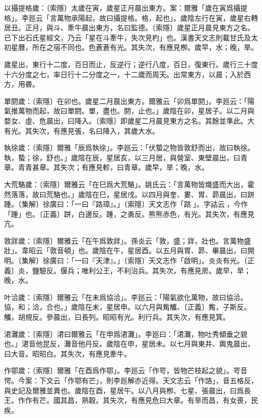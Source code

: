 以攝提格歲：〔索隱〕太歲在寅，歲星正月晨出東方。案：爾雅「歲在寅爲攝提格」。李廵云「言萬物承陽起，故曰攝提格。格，起也」。歲陰左行在寅，歲星右轉居丑。正月，與斗、牽牛晨出東方，名曰監德。〔索隱〕歲星正月晨見東方之名。已下出石氏星經文，乃云「星在斗牽牛，失次見杓」也。漢書天文志則載甘氏及太初星曆，所在之宿不同也。色蒼蒼有光。其失次，有應見栁。歲早，水；晚，旱。

歲星出，東行十二度，百日而止，反逆行；逆行八度，百日，復東行。歲行三十度十六分度之七，率日行十二分度之一，十二歲而周天。出常東方，以晨；入於西方，用昬。

單閼歲：〔索隱〕在卯也。歲星二月晨出東方。爾雅云「卯爲單閼」。李廵云：「陽氣推萬物而起，故曰單閼。單，盡也。閼，止也。」歲陰在卯，星居子。以二月與婺女、虛、危晨出，曰降入。〔索隱〕即歲星二月晨見東方之名。其餘並準此。大有光。其失次，有應見張，名曰降入，其歲大水。

執徐歲：〔索隱〕爾雅「辰爲執徐」。李廵云：「伏蟄之物皆敦舒而出，故曰執徐。執，蟄；徐，舒也。」歲陰在辰，星居亥，以三月居，與營室、東壁晨出，曰青章。青青甚章。其失次；有應見軫，曰青章。歲早，旱；晚，水。

大荒駱歲：〔索隱〕爾雅云「在巳爲大荒駱」。姚氏云：「言萬物皆熾盛而大出，霍然落落，故曰荒駱也。」歲陰在巳，星居戌。以四月與奎、婁、胃、昴晨出，曰跰踵。〔集解〕徐廣曰：「一曰『路璋』。」〔索隱〕天文志作「路𡺽」。字詁云𡺽，今作「踵」也。〔正義〕跰，白邊反。踵，之勇反。熊熊赤色，有光。其失次，有應見亢。

敦牂歲：〔索隱〕爾雅云「在午爲敦牂」。孫炎云「敦，盛；牂，壯也。言萬物盛壯」。韋昭云「敦音頓」也。歲陰在午，星居酉。以五月與胃、昴、畢晨出，曰開明。〔集解〕徐廣曰：「一曰『天津』。」〔索隱〕天文志作「啟明」。炎炎有光。〔正義〕炎，鹽驗反。偃兵；唯利公王，不利治兵。其失次，有應見房。歲早，旱；晚，水。

叶洽歲：〔索隱〕爾雅云「在未爲協洽」。李廵云：「陽氣欲化萬物，故曰協洽。協，和；洽，合也。」歲陰在未，星居申。以六月與觜觿、〔正義〕觜，子斯反。觿，胡規反。參晨出，曰長列。昭昭有光。利行兵。其失次，有應見箕。

涒灘歲：〔索隱〕涒曰爾雅云「在申爲涒灘」。李廵曰：「涒灘，物吐秀傾垂之貌也。」涒音他昆反，灘音他丹反。歲陰在申，星居未。以七月與東井、輿鬼晨出，曰大音。昭昭白。其失次，有應見牽牛。

作鄂歲：〔索隱〕爾雅「在酉爲作鄂」。李廵云「作咢，皆物芒枝起之貌」。咢音愕。今案：下文云「作鄂有芒」，則李廵解亦近得。天文志云「作詻」，音五格反，與史記及爾雅並異也。歲陰在酉，星居午。以八月與栁、七星、張晨出，曰爲長王。作作有芒。國其昌，熟穀。其失次，有應見危曰大章。有旱而昌，有女喪，民疾。

